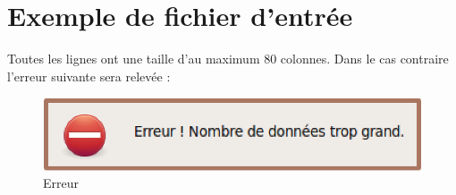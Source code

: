 \section{Exemple de fichier d'entrée} 
Toutes les lignes ont une taille d’au maximum 80 colonnes. Dans le cas contraire l'erreur suivante sera relevée : 
\begin{figure}[htbp]
  \includegraphics[scale=0.40]{img/enbdonnes}
  \caption{Erreur}
  \label{fig:enbdonees}
\end{figure}


